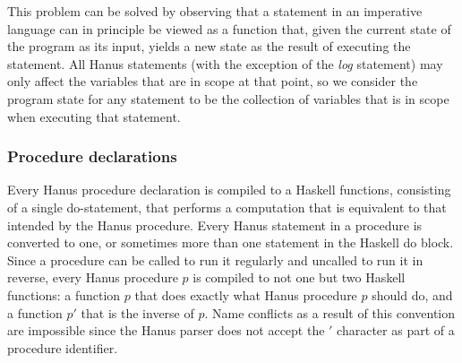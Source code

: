 \documentclass[12pt,a4paper]{article}
\begin{document}
This problem can be solved by observing that a statement in an imperative language can in principle be viewed as a function that, given the current state of the program as its input, yields a new state as the result of executing the statement. All Hanus statements (with the exception of the \emph{log} statement) may only affect the variables that are in scope at that point, so we consider the program state for any statement to be the collection of variables that is in scope when executing that statement. 

\subsubsection{Procedure declarations}
Every Hanus procedure declaration is compiled to a Haskell functions, consisting of a single do-statement, that performs a computation that is equivalent to that intended by the Hanus procedure. Every Hanus statement in a procedure is converted to one, or sometimes more than one statement in the Haskell do block. Since a procedure can be called to run it regularly and uncalled to run it in reverse, every Hanus procedure $p$ is compiled to not one but two Haskell functions: a function $p$ that does exactly what Hanus procedure $p$ should do, and a function $p'$ that is the inverse of $p$. Name conflicts as a result of this convention are impossible since the Hanus parser does not accept the $'$ character as part of a procedure identifier.
\end{document}
